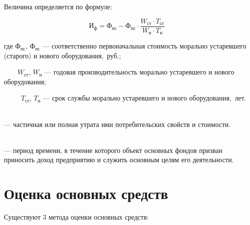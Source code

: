 \begin{tcolorbox}
Величина  определяется по формуле:

\begin{equation}
    \text{И}_{\text{ф}} = \text{Ф}_{\text{пс}} - \text{Ф}_{\text{пс}} \cdot
    \frac{W_{\text{ст}} \cdot T_{\text{ст}}}{W_{\text{н}} \cdot T_{\text{н}}}
\end{equation}

где $\text{Ф}_{\text{пс}}$, $\text{Ф}_{\text{пс}}$ --- соответственно
первоначальная стоимость морально устаревшего (старого) и нового
оборудования,~руб.;

~~~~$W_{\text{ст}}$, $W_{\text{н}}$ --- годовая производительность морально
устаревшего и нового оборудования;

~~~~~$T_{\text{ст}}$, $T_{\text{н}}$ --- срок службы морально устаревшего и нового
оборудования,~лет.
\end{tcolorbox}

\begin{definition}
    \normalfont
    ~\\
     --- частичная или полная утрата ими
    потребительских свойств и стоимости.
\end{definition}

\begin{definition}
    \normalfont
    ~\\
     --- период времени, в
    течение которого объект основных фондов призван приносить доход предприятию
    и служить основным целям его деятельности.
\end{definition}


\section{Оценка основных средств}

Существуют 3 метода оценки основных средств:


